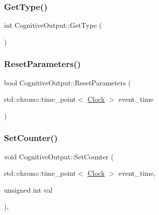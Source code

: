 \mbox{\label{classCognitiveOutput_ac5ead5e6a98556d6779eda5679b69594}} 
\subsubsection{\texorpdfstring{Get\+Type()}{GetType()}}
{\footnotesize\ttfamily int Cognitive\+Output\+::\+Get\+Type (\begin{DoxyParamCaption}{ }\end{DoxyParamCaption})\hspace{0.3cm}{\ttfamily [inline]}}

\mbox{\label{classCognitiveOutput_ab43b79aaadf75d18512c4379a77542cd}} 
\subsubsection{\texorpdfstring{Reset\+Parameters()}{ResetParameters()}}
{\footnotesize\ttfamily bool Cognitive\+Output\+::\+Reset\+Parameters (\begin{DoxyParamCaption}\item[{std\+::chrono\+::time\+\_\+point$<$ \mbox{\hyperlink{universe_8h_a0ef8d951d1ca5ab3cfaf7ab4c7a6fd80}{Clock}} $>$}]{event\+\_\+time }\end{DoxyParamCaption})}

\mbox{\label{classCognitiveOutput_a087e8bdab9eb6020dbbe6d47f524c8b6}} 
\subsubsection{\texorpdfstring{Set\+Counter()}{SetCounter()}}
{\footnotesize\ttfamily void Cognitive\+Output\+::\+Set\+Counter (\begin{DoxyParamCaption}\item[{std\+::chrono\+::time\+\_\+point$<$ \mbox{\hyperlink{universe_8h_a0ef8d951d1ca5ab3cfaf7ab4c7a6fd80}{Clock}} $>$}]{event\+\_\+time,  }\item[{unsigned int}]{val }\end{DoxyParamCaption})\hspace{0.3cm}{\ttfamily [inline]}, {\ttfamily [virtual]}}



